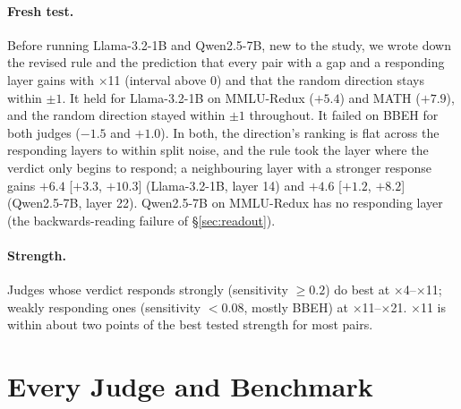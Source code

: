 \paragraph{Fresh test.} Before running Llama-3.2-1B and Qwen2.5-7B, new to the study, we wrote down the revised rule and the prediction that every pair with a gap and a responding layer gains with $\times$11 (interval above 0) and that the random direction stays within $\pm1$. It held for Llama-3.2-1B on MMLU-Redux ($+5.4$) and MATH ($+7.9$), and the random direction stayed within $\pm1$ throughout. It failed on BBEH for both judges ($-1.5$ and $+1.0$). In both, the direction's ranking is flat across the responding layers to within split noise, and the rule took the layer where the verdict only begins to respond; a neighbouring layer with a stronger response gains $+6.4$ [$+3.3$, $+10.3$] (Llama-3.2-1B, layer 14) and $+4.6$ [$+1.2$, $+8.2$] (Qwen2.5-7B, layer 22). Qwen2.5-7B on MMLU-Redux has no responding layer (the backwards-reading failure of \S\ref{sec:readout}).

\paragraph{Strength.} Judges whose verdict responds strongly (sensitivity $\ge 0.2$) do best at $\times$4--$\times$11; weakly responding ones (sensitivity $< 0.08$, mostly BBEH) at $\times$11--$\times$21. $\times$11 is within about two points of the best tested strength for most pairs.

\section{Every Judge and Benchmark}
\label{app:pairs}

\begin{table}[h]
\centering
\small

\caption{Every judge--benchmark pair. Gap: best layer's direction ranking minus the verdict's, on the split used for the layer rule; 20 splits: mean $\pm$ standard deviation over 20 random half-splits of the questions (at the best layer). Layer: the layer the rule stretches ($^*$: no layer responds; best-ranking layer). Sens.: the verdict's sensitivity there. Llama-3.1-70B is the scale check of \S\ref{sec:scale}. Last four columns: ranking ($\times$100) of the forced verdict, the verdict after reasoning, the verdict after stretching $\times$11, and the direction, on the main answer pool.}
\label{tab:pairs}
\end{table}

